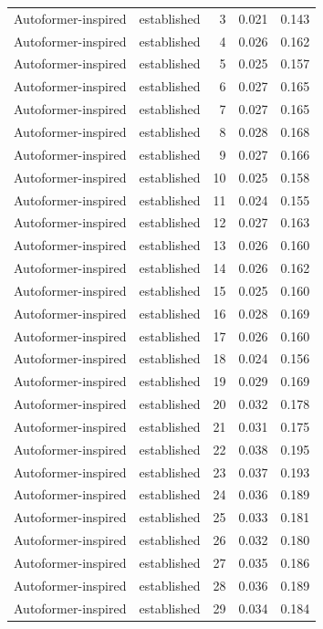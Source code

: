 \begin{tabular}{llrrr}
Autoformer-inspired & established & 3 & 0.021 & 0.143 \\
Autoformer-inspired & established & 4 & 0.026 & 0.162 \\
Autoformer-inspired & established & 5 & 0.025 & 0.157 \\
Autoformer-inspired & established & 6 & 0.027 & 0.165 \\
Autoformer-inspired & established & 7 & 0.027 & 0.165 \\
Autoformer-inspired & established & 8 & 0.028 & 0.168 \\
Autoformer-inspired & established & 9 & 0.027 & 0.166 \\
Autoformer-inspired & established & 10 & 0.025 & 0.158 \\
Autoformer-inspired & established & 11 & 0.024 & 0.155 \\
Autoformer-inspired & established & 12 & 0.027 & 0.163 \\
Autoformer-inspired & established & 13 & 0.026 & 0.160 \\
Autoformer-inspired & established & 14 & 0.026 & 0.162 \\
Autoformer-inspired & established & 15 & 0.025 & 0.160 \\
Autoformer-inspired & established & 16 & 0.028 & 0.169 \\
Autoformer-inspired & established & 17 & 0.026 & 0.160 \\
Autoformer-inspired & established & 18 & 0.024 & 0.156 \\
Autoformer-inspired & established & 19 & 0.029 & 0.169 \\
Autoformer-inspired & established & 20 & 0.032 & 0.178 \\
Autoformer-inspired & established & 21 & 0.031 & 0.175 \\
Autoformer-inspired & established & 22 & 0.038 & 0.195 \\
Autoformer-inspired & established & 23 & 0.037 & 0.193 \\
Autoformer-inspired & established & 24 & 0.036 & 0.189 \\
Autoformer-inspired & established & 25 & 0.033 & 0.181 \\
Autoformer-inspired & established & 26 & 0.032 & 0.180 \\
Autoformer-inspired & established & 27 & 0.035 & 0.186 \\
Autoformer-inspired & established & 28 & 0.036 & 0.189 \\
Autoformer-inspired & established & 29 & 0.034 & 0.184 \\

\end{tabular}
